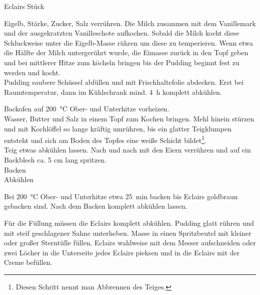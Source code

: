 \begin{MyRecipe}{Eclairs}{ Stück}{}

	
	Eigelb, Stärke, Zucker, Salz verrühren. Die Milch zusammen mit dem Vanillemark und der ausgekratzten Vanilleschote aufkochen. Sobald die Milch kocht diese Schluckweise unter die Eigelb-Masse rühren um diese zu temperieren. Wenn etwa die Hälfte der Milch untergerührt wurde, die Eimasse zurück in den Topf geben und bei mittlerer Hitze zum köcheln bringen bis der Pudding beginnt fest zu werden und kocht.\\
	Pudding saubere Schüssel abfüllen und mit Frischhaltefolie abdecken. Erst bei Raumtemperatur, dann im Kühlschrank mind. \SI{4}{\hour} komplett abkühlen.\par\bigskip

	
	
	Backofen auf \SI{200}{\degreeCelsius} Ober- und Unterhitze vorheizen.\\
	Wasser, Butter und Salz in einem Topf zum Kochen bringen. Mehl hinein stürzen und mit Kochlöffel so lange kräftig umrühren, bis ein glatter Teigklumpen entsteht und sich am Boden des Topfes eine weiße Schicht bildet\footnote{Diesen Schritt nennt man Abbrennen des Teiges.}.\\
	Teig etwas abkühlen lassen. Nach und nach mit den Eiern verrühren und auf ein Backblech ca. 5 cm lang spritzen.\\
	Backen\\
	Abkühlen\par\bigskip
	
	Bei \SI{200}{\degreeCelsius} Ober- und Unterhitze etwa \SI{25}{\minute} backen bis Eclairs goldbraun gebacken sind. Nach dem Backen komplett abkühlen lassen.\par\bigskip
		
	
	Für die Füllung müssen die Eclairs komplett abkühlen. Pudding glatt rühren und mit steif geschlagener Sahne unterheben. Masse in einen Spritzbeutel mit kleiner oder großer Sterntülle füllen. Eclairs wahlweise mit dem Messer aufschneiden oder zwei Löcher in die Unterseite jedes Eclairs pieksen und in die Eclairs mit der Creme befüllen.\par\bigskip
	

\end{MyRecipe}

